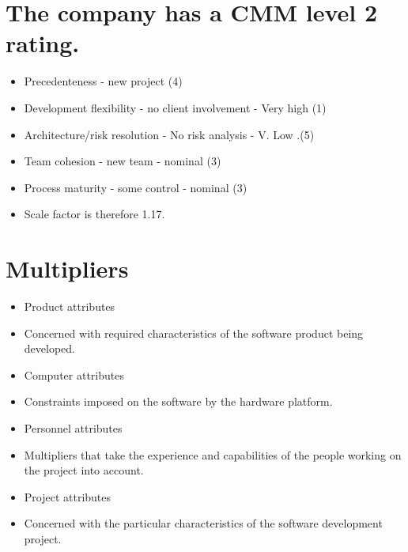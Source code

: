 \section{The company has a CMM level 2 rating.}
\begin{itemize}

  \item Precedenteness - new project (4)
  \item Development flexibility - no client involvement - Very high (1)   \item Architecture/risk resolution - No risk analysis - V. Low .(5)   \item Team cohesion - new team - nominal (3)
  \item Process maturity - some control - nominal (3) \item Scale factor is therefore 1.17.
\end{itemize}

\section{Multipliers}
\begin{itemize}

\item Product attributes

  \item Concerned with required characteristics of the software product being developed.

\item Computer attributes

  \item Constraints imposed on the software by the hardware platform.

\item Personnel attributes

  \item Multipliers that take the experience and capabilities of the people working on the project into account.

\item Project attributes

  \item Concerned with the particular characteristics of the software development project.
\end{itemize}
\newpage
